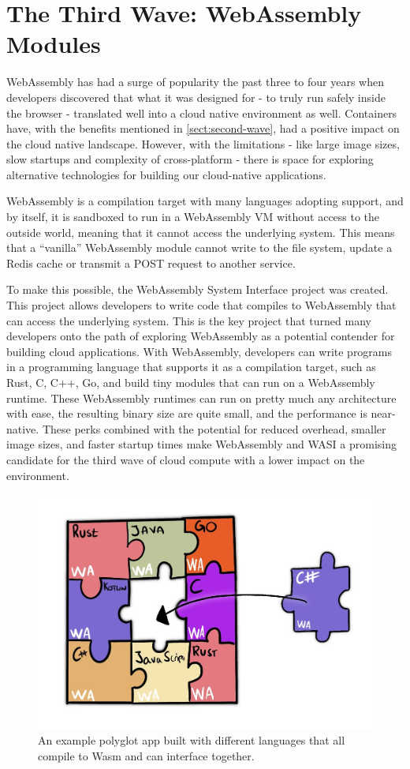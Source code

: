 \documentclass[
  table]{report}
\begin{document}
\section{The Third Wave: WebAssembly Modules}
\label{sect:third-wave}

WebAssembly has had a surge of popularity the past three to four years
when developers discovered that what it was designed for - to truly run
safely inside the browser - translated well into a cloud native
environment as well. Containers have, with the benefits mentioned in
\cref{sect:second-wave}, had a positive impact on the cloud native
landscape. However, with the limitations - like large image sizes, slow
startups and complexity of cross-platform - there is space for exploring
alternative technologies for building our cloud-native applications.

WebAssembly is a compilation target with many languages adopting
support, and by itself, it is sandboxed to run in a WebAssembly \ac{VM}
without access to the outside world, meaning that it cannot access the
underlying system. This means that a ``vanilla'' WebAssembly module
cannot write to the file system, update a Redis cache or transmit a POST
request to another service.

To make this possible, the WebAssembly System Interface project was
created. This project allows developers to write code that compiles to
WebAssembly that can access the underlying system. This is the key
project that turned many developers onto the path of exploring
WebAssembly as a potential contender for building cloud applications.
With WebAssembly, developers can write programs in a programming
language that supports it as a compilation target, such as Rust, C, C++,
Go, and build tiny modules that can run on a WebAssembly runtime. These
WebAssembly runtimes can run on pretty much any architecture with ease,
the resulting binary size are quite small, and the performance is
near-native. These perks combined with the potential for reduced
overhead, smaller image sizes, and faster startup times make WebAssembly
and \ac{WASI} a promising candidate for the third wave of cloud compute
with a lower impact on the environment.

\begin{figure}[H]
\centering
  \includegraphics[width=0.8\columnwidth]{assets/wasm-wave.jpg}
  \caption{An example polyglot app built with different languages that all
compile to \ac{Wasm} and can interface together.}
  \label{fig:wasm-wave}
\end{figure}
\end{document}
